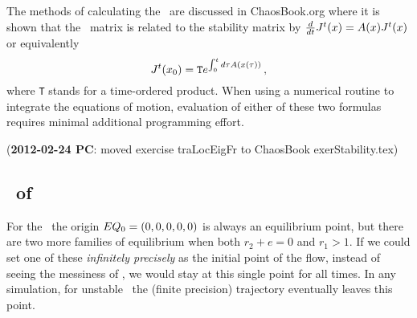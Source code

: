 The methods of calculating the \jacobianM\ are discussed in ChaosBook.org where it is shown that the \jacobianM\ matrix is related to the stability matrix by $\frac{d}{dt} J^t(x)=A (x) J^t(x)$ or equivalently
\[
J^t({x_0})= \texttt{T} e^{\int^t_0 d\tau A (x(\tau))}
 \,,
\]
where \texttt{T} stands for a time-ordered product. When using a
numerical routine to integrate the equations of motion, evaluation of
either of these two formulas requires minimal additional programming
effort.

({\bf 2012-02-24 PC}: moved exercise traLocEigFr to ChaosBook
exerStability.tex)


\subsection{\Eqva\ of \cLe}

For the \cLe\, the
origin $EQ_{0}=(0, 0, 0, 0, 0)$ is always an equilibrium
point, but there are two more families of equilibrium when
both $r_2 + e=0$ and $r_1>1$. If we could set one of these
{\em infinitely precisely} as the initial point of the flow,
instead of seeing the messiness of , we
would stay at this single point for all times. In any
simulation, for unstable \reqv\ the (finite precision)
trajectory eventually leaves this point.


